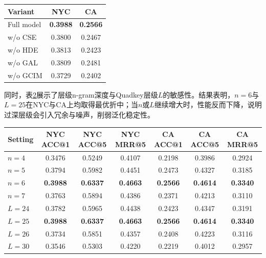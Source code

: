 \begin{table}[htbp]
    \tblstyle
    \label{tab:c4-gcim-inner-ablation}
    \begin{tabular}{lcc}
        \toprule
        Variant & NYC & CA \\
        \midrule
        Full model & \textbf{0.3988} & \textbf{0.2566} \\
        w/o CSE & 0.3800 & 0.2467 \\
        w/o HDE & 0.3813 & 0.2423 \\
        w/o GAL & 0.3809 & 0.2481 \\
        w/o GCIM & 0.3729 & 0.2402 \\
        \bottomrule
    \end{tabular}
\end{table}

同时，表\ref{tab:c4-gcim-hparam}展示了层级n-gram深度与Quadkey层级$L$的敏感性。结果表明，$n=6$与$L=25$在NYC与CA上均取得最优折中；当$n$或$L$继续增大时，性能反而下降，说明过深层级会引入冗余与噪声，削弱泛化稳定性。

\begin{table}[htbp]
    \tblstyle
    \label{tab:c4-gcim-hparam}
    \begin{tabular}{lcccccc}
        \toprule
        Setting & NYC ACC@1 & NYC ACC@5 & NYC MRR@5 & CA ACC@1 & CA ACC@5 & CA MRR@5 \\
        \midrule
        $n=4$ & 0.3476 & 0.5249 & 0.4107 & 0.2198 & 0.3986 & 0.2924 \\
        $n=5$ & 0.3794 & 0.5982 & 0.4451 & 0.2473 & 0.4327 & 0.3185 \\
        $n=6$ & \textbf{0.3988} & \textbf{0.6337} & \textbf{0.4663} & \textbf{0.2566} & \textbf{0.4614} & \textbf{0.3340} \\
        $n=7$ & 0.3763 & 0.5894 & 0.4386 & 0.2371 & 0.4213 & 0.3110 \\
        \midrule
        $L=24$ & 0.3782 & 0.5965 & 0.4438 & 0.2423 & 0.4347 & 0.3191 \\
        $L=25$ & \textbf{0.3988} & \textbf{0.6337} & \textbf{0.4663} & \textbf{0.2566} & \textbf{0.4614} & \textbf{0.3340} \\
        $L=26$ & 0.3734 & 0.5851 & 0.4357 & 0.2408 & 0.4223 & 0.3116 \\
        $L=30$ & 0.3546 & 0.5303 & 0.4220 & 0.2219 & 0.4012 & 0.2957 \\
        \bottomrule
    \end{tabular}
\end{table}

